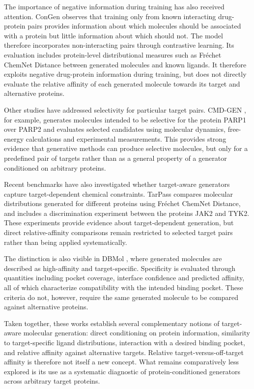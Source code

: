 \documentclass[a4paper,12pt]{article}
\begin{document}
The importance of negative information during training has also received
attention. ConGen \parencite{Koban_Uludogan_Ozkirimli_2026} observes that
training only from known interacting drug-protein pairs provides information
about which molecules should be associated with a protein but little
information about which should not. The model therefore incorporates
non-interacting pairs through contrastive learning. Its evaluation includes
protein-level distributional measures such as Fréchet ChemNet Distance between
generated molecules and known ligands. It therefore exploits negative
drug-protein information during training, but does not directly evaluate the
relative affinity of each generated molecule towards its target and
alternative proteins.

Other studies have addressed selectivity for particular target pairs.
CMD-GEN \parencite{Zou_Guo_Fu_2025}, for example, generates molecules intended
to be selective for the protein PARP1 over PARP2 and evaluates selected candidates using
molecular dynamics, free-energy calculations and experimental measurements. This provides strong evidence that
generative methods can produce selective molecules, but only for a predefined
pair of targets rather than as a general property of a generator conditioned
on arbitrary proteins.

Recent benchmarks have also investigated whether target-aware generators
capture target-dependent chemical constraints. TarPass
\parencite{Qin_Chen_Li_2026} compares molecular distributions generated for
different proteins using Fréchet ChemNet Distance, and includes a discrimination experiment between the proteins JAK2
and TYK2. These experiments provide evidence about target-dependent generation,
but direct relative-affinity comparisons remain restricted to selected target
pairs rather than being applied systematically.

The distinction is also visible in DBMol
\parencite{Qin_Yi_Cretu_2026}, where generated molecules are described as
high-affinity and target-specific. Specificity is evaluated through quantities
including pocket coverage, interface confidence and predicted affinity, all of
which characterize compatibility with the intended binding pocket. These
criteria do not, however, require the same generated molecule to be compared
against alternative proteins.

Taken together, these works establish several complementary notions of
target-aware molecular generation: direct conditioning on protein information,
similarity to target-specific ligand distributions, interaction with a desired
binding pocket, and relative affinity against alternative targets. Relative
target-versus-off-target affinity is therefore not itself a new concept.
What remains comparatively less explored is its use as a systematic diagnostic
of protein-conditioned generators across arbitrary target proteins.
\end{document}

